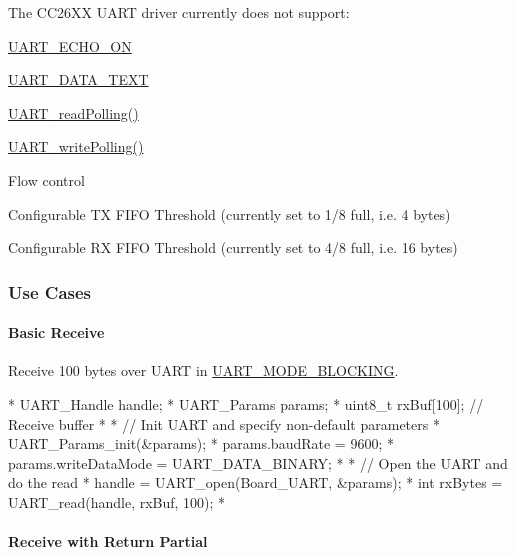 The C\-C26\-X\-X U\-A\-R\-T driver currently does not support\-:
\begin{DoxyItemize}
\item \hyperlink{_u_a_r_t_8h_aac6a03c2e1d76f53e1d9d923dcdc24f2a6c4d8a2d4e30c22cf9fa45cd1bf79306}{U\-A\-R\-T\-\_\-\-E\-C\-H\-O\-\_\-\-O\-N}
\item \hyperlink{_u_a_r_t_8h_a694090fdb166f94ac30b809f9cba87b8a87fdfb7ca981eab7f56c51380fd7094e}{U\-A\-R\-T\-\_\-\-D\-A\-T\-A\-\_\-\-T\-E\-X\-T}
\item \hyperlink{_u_a_r_t_8h_aee4c56b20ea1c4c33406d99369db3df1}{U\-A\-R\-T\-\_\-read\-Polling()}
\item \hyperlink{_u_a_r_t_8h_aed09b432b5ebb7d88e78ccfe338e1bd4}{U\-A\-R\-T\-\_\-write\-Polling()}
\item Flow control
\item Configurable T\-X F\-I\-F\-O Threshold (currently set to 1/8 full, i.\-e. 4 bytes)
\item Configurable R\-X F\-I\-F\-O Threshold (currently set to 4/8 full, i.\-e. 16 bytes)
\end{DoxyItemize}

\subsubsection*{Use Cases\label{_u_a_r_t_c_c26_x_x_8h_USE_CASES}%
\hypertarget{_u_a_r_t_c_c26_x_x_8h_USE_CASES}{}%
}

\paragraph*{Basic Receive}

Receive 100 bytes over U\-A\-R\-T in \hyperlink{_u_a_r_t_8h_a2507a620dba95cd20885c52494d19e90ae6b6bd5d2d5df859ad6724e89e605ebf}{U\-A\-R\-T\-\_\-\-M\-O\-D\-E\-\_\-\-B\-L\-O\-C\-K\-I\-N\-G}. 
\begin{DoxyCode}
*  UART_Handle handle;
*  UART_Params params;
*  uint8\_t rxBuf[100];     \textcolor{comment}{// Receive buffer}
*
*  \textcolor{comment}{// Init UART and specify non-default parameters}
*  UART_Params_init(&params);
*  params.baudRate      = 9600;
*  params.writeDataMode = UART_DATA_BINARY;
*
*  \textcolor{comment}{// Open the UART and do the read}
*  handle = UART_open(Board\_UART, &params);
*  \textcolor{keywordtype}{int} rxBytes = UART_read(handle, rxBuf, 100);
*  
\end{DoxyCode}


\paragraph*{Receive with Return Partial}

